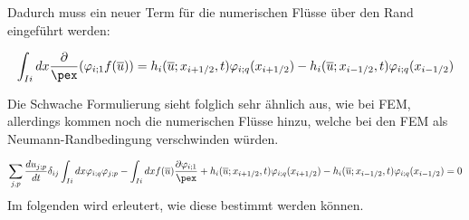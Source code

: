 \par
Dadurch muss ein neuer Term f\"ur die numerischen Fl\"usse \"uber den Rand eingef\"uhrt werden:
\par
\begin{equation*}
	\int_{Ii}dx\frac{\partial}{\pex}(\varphi_{i;1}f(\overline{u})) = h_i(\overline{u};x_{i+1/2},t)\varphi_{i;q}(x_{i+1/2}) - h_i(\overline{u};x_{i-1/2},t)\varphi_{i;q}(x_{i-1/2})
\end{equation*}
\par
\vspace{-2.5em}
\par
Die Schwache Formulierung sieht folglich sehr \"ahnlich aus, wie bei FEM, allerdings kommen noch die numerischen Fl\"usse hinzu, welche bei den FEM als Neumann-Randbedingung verschwinden w\"urden.
\par
\begin{equation*}
	\sum_{j,p}\frac{du_{j;p}}{dt}\delta_{ij}\int_{Ii}dx\varphi_{i;q}\varphi_{j;p} - \int_{Ii}dxf(\overline{u})\frac{\partial \varphi_{i;1}}{\pex} + h_i(\overline{u};x_{i+1/2},t)\varphi_{i;q}(x_{i+1/2}) - h_i(\overline{u};x_{i-1/2},t)\varphi_{i;q}(x_{i-1/2}) =  0
\end{equation*}
Im folgenden wird erleutert, wie diese bestimmt werden k\"onnen.

